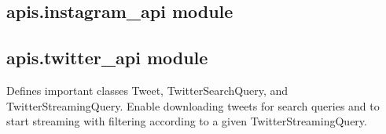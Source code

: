 \documentclass[letterpaper,10pt,english]{sphinxmanual}
\begin{document}

\begin{fulllineitems}
\label{apis:apis.flickr_api.count_photos}
\end{fulllineitems}


\begin{fulllineitems}
\label{apis:apis.flickr_api.get_photo_collection}
\end{fulllineitems}


\begin{fulllineitems}
\label{apis:apis.flickr_api.get_points}
\end{fulllineitems}


\begin{fulllineitems}
\label{apis:apis.flickr_api.print_places}
\end{fulllineitems}


\begin{fulllineitems}
\label{apis:apis.flickr_api.retrieve_place_name}
\end{fulllineitems}



\subsection{apis.instagram\_api module}
\label{apis:apis-instagram-api-module}\label{apis:module-apis.instagram_api}

\subsection{apis.twitter\_api module}
\label{apis:module-apis.twitter_api}\label{apis:apis-twitter-api-module}
Defines important classes Tweet, TwitterSearchQuery, and TwitterStreamingQuery. Enable downloading tweets for search queries and to start streaming with filtering according to a given TwitterStreamingQuery.
\end{document}
